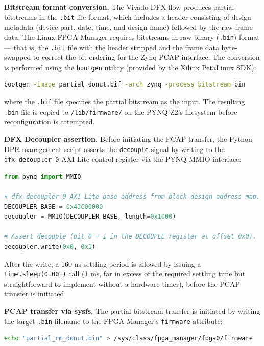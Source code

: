 \textbf{Bitstream format conversion.} The Vivado DFX flow produces partial bitstreams in the \texttt{.bit} file format, which includes a header consisting of design metadata (device part, date, time, and design name) followed by the raw frame data. The Linux FPGA Manager requires bitstreams in raw binary (\texttt{.bin}) format — that is, the \texttt{.bit} file with the header stripped and the frame data byte-swapped to correct the bit ordering for the Zynq PCAP interface. The conversion is performed using the \texttt{bootgen} utility (provided by the Xilinx PetaLinux SDK):

\begin{lstlisting}[style=mystyle, language=bash]
bootgen -image partial_donut.bif -arch zynq -process_bitstream bin
\end{lstlisting}

where the \texttt{.bif} file specifies the partial bitstream as the input. The resulting \texttt{.bin} file is copied to \texttt{/lib/firmware/} on the PYNQ-Z2's filesystem before reconfiguration is attempted.

\textbf{DFX Decoupler assertion.} Before initiating the PCAP transfer, the Python DPR management script asserts the \texttt{decouple} signal by writing to the \texttt{dfx\_decoupler\_0} AXI-Lite control register via the PYNQ MMIO interface:

\begin{lstlisting}[style=mystyle, language=Python]
from pynq import MMIO

# dfx_decoupler_0 AXI-Lite base address from block design address map.
DECOUPLER_BASE = 0x43C00000
decoupler = MMIO(DECOUPLER_BASE, length=0x1000)

# Assert decouple (bit 0 = 1 in the DECOUPLE register at offset 0x0).
decoupler.write(0x0, 0x1)
\end{lstlisting}

After the write, a 160 ns settling period is allowed by issuing a \texttt{time.sleep(0.001)} call (1 ms, far in excess of the required settling time but straightforward to implement without a hardware timer), before the PCAP transfer is initiated.

\textbf{PCAP transfer via sysfs.} The partial bitstream transfer is initiated by writing the target \texttt{.bin} filename to the FPGA Manager's \texttt{firmware} attribute:

\begin{lstlisting}[style=mystyle, language=bash]
echo "partial_rm_donut.bin" > /sys/class/fpga_manager/fpga0/firmware
\end{lstlisting}

